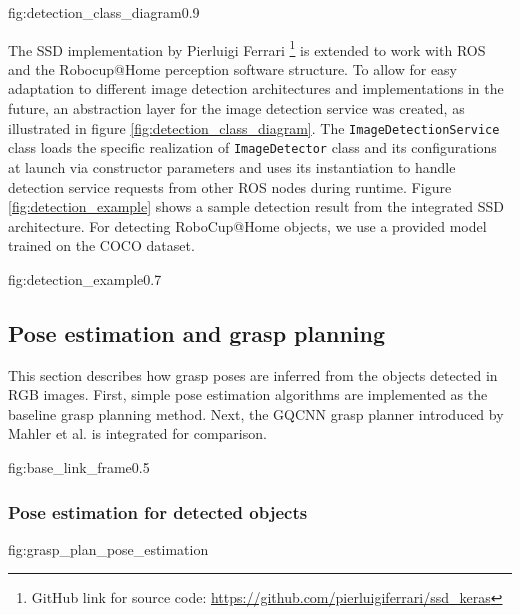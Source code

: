              {fig:detection_class_diagram}{0.9\textwidth}

The SSD implementation by Pierluigi Ferrari \footnote{GitHub link for source code:
\url{https://github.com/pierluigiferrari/ssd_keras}} is extended to work with ROS and the Robocup@Home perception
software structure. To allow for easy adaptation to different image detection architectures and implementations in the
future, an abstraction layer for the image detection service was created, as illustrated in figure
\ref{fig:detection_class_diagram}. The \texttt{ImageDetectionService} class loads the specific realization of
\texttt{ImageDetector} class and its configurations at launch via constructor parameters and uses its instantiation to
handle detection service requests from other ROS nodes during runtime. Figure \ref{fig:detection_example} shows a
sample detection result from the integrated SSD architecture. For detecting RoboCup@Home objects, we use a provided
model trained on the COCO dataset.

{fig:detection_example}{0.7\textwidth}

\subsection{Pose estimation and grasp planning}

This section describes how grasp poses are inferred from the objects detected in RGB images. First, simple pose
estimation algorithms are implemented as the baseline grasp planning method. Next, the GQCNN grasp planner introduced
by Mahler et al. \cite{mahler2017} is integrated for comparison.

{fig:base_link_frame}{0.5\textwidth}

\subsubsection*{Pose estimation for detected objects}

             {fig:grasp_plan_pose_estimation}{\textwidth}

